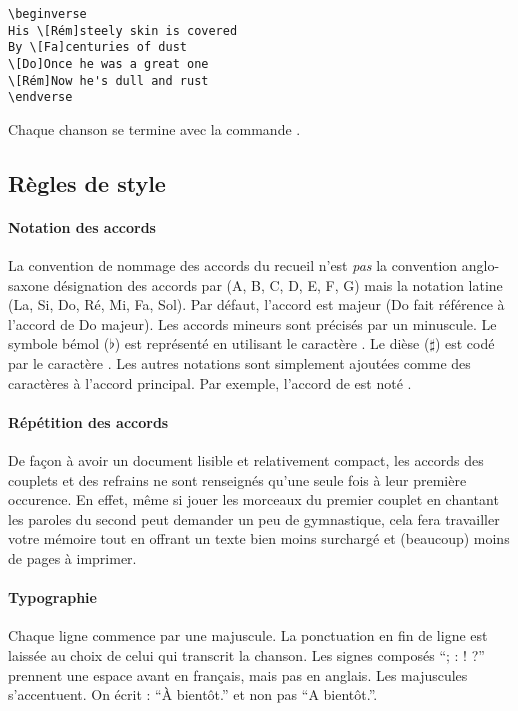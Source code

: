\documentclass[online]{patacrep}
\begin{document}
\begin{center}
\begin{verbatim}
\beginverse
His \[Rém]steely skin is covered
By \[Fa]centuries of dust
\[Do]Once he was a great one
\[Rém]Now he's dull and rust
\endverse
\end{verbatim}
\end{center}

Chaque chanson se termine avec la commande .

\subsection{Règles de style}

\paragraph{Notation des accords}
La convention de nommage des accords du recueil n'est \emph{pas} la
convention anglo-saxone désignation des accords par (A, B, C, D, E, F,
G) mais la notation latine (La, Si, Do, Ré, Mi, Fa, Sol). Par défaut,
l'accord est majeur (Do fait référence à l'accord de Do majeur). Les
accords mineurs sont précisés par un  minuscule.  Le
symbole bémol ($\flat$) est représenté en utilisant le caractère
\command{\&}.  Le dièse ($\sharp$) est codé par le caractère
\command{\#}. Les autres notations sont simplement ajoutées comme des
caractères à l'accord principal. Par exemple, l'accord de  est noté \latexcom{[La\&m]}.

\paragraph{Répétition des accords}
De façon à avoir un document lisible et relativement compact, les
accords des couplets et des refrains ne sont renseignés qu'une seule
fois à leur première occurence. En effet, même si jouer les morceaux
du premier couplet en chantant les paroles du second peut demander un
peu de gymnastique, cela fera travailler votre mémoire tout en offrant
un texte bien moins surchargé et (beaucoup) moins de pages à imprimer.

\paragraph{Typographie}
Chaque ligne commence par une majuscule. La ponctuation en fin de
ligne est laissée au choix de celui qui transcrit la chanson.  Les
signes composés ``; : ! ?'' prennent une espace avant en français,
mais pas en anglais. Les majuscules s'accentuent. On écrit : ``À
bientôt.'' et non pas ``A bientôt.''.
\end{document}
